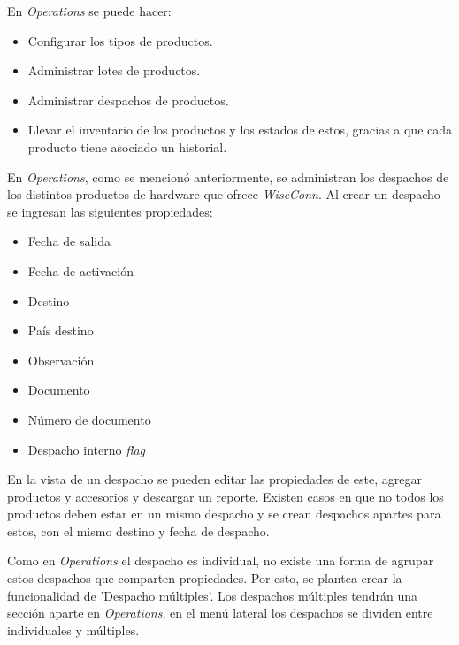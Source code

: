 En \textit{Operations} se puede hacer:

\begin{itemize}
    \item Configurar los tipos de productos.
    \item Administrar lotes de productos.
    \item Administrar despachos de productos.
    \item Llevar el inventario de los productos y los estados de estos, gracias a que cada producto tiene asociado un historial.
\end{itemize}


En \textit{Operations}, como se mencionó anteriormente, se administran los despachos de los distintos productos de hardware que ofrece \textit{WiseConn}.
Al crear un despacho se ingresan las siguientes propiedades:
\begin{itemize}
    \item Fecha de salida
    \item Fecha de activación
    \item Destino
    \item País destino
    \item Observación
    \item Documento
    \item Número de documento
    \item Despacho interno \textit{flag}    
\end{itemize}

En la vista de un despacho se pueden editar las propiedades de este, agregar productos y accesorios y descargar un reporte. Existen casos en que no todos los productos deben estar en un mismo despacho y se crean despachos apartes para estos, con el mismo destino y fecha de despacho.

Como en \textit{Operations} el despacho es individual, no existe una forma de agrupar estos despachos que comparten propiedades. Por esto, se plantea crear la funcionalidad de 'Despacho múltiples'. 
Los despachos múltiples tendrán una sección aparte en \textit{Operations}, en el menú lateral los despachos se dividen entre individuales y múltiples.

